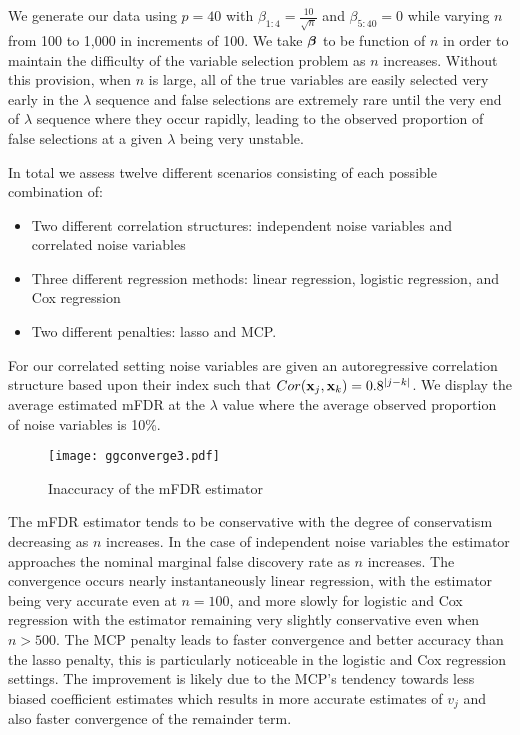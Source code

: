 We generate our data using $p = 40$ with $\beta_{1:4} = \frac{10}{\sqrt{n}}$ and $\beta_{5:40} = 0$ while varying $n$ from 100 to 1,000 in increments of 100. We take $\boldsymbol{\beta}$ to be function of $n$ in order to maintain the difficulty of the variable selection problem as $n$ increases.  Without this provision, when $n$ is large, all of the true variables are easily selected very early in the $\lambda$ sequence and false selections are extremely rare until the very end of $\lambda$ sequence where they occur rapidly, leading to the observed proportion of false selections at a given $\lambda$ being very unstable.

In total we assess twelve different scenarios consisting of each possible combination of:
\begin{itemize}
\item Two different correlation structures: independent noise variables and correlated noise variables
\item Three different regression methods: linear regression, logistic regression, and Cox regression
\item Two different penalties: lasso and MCP. 
\end{itemize}
For our correlated setting noise variables are given an autoregressive correlation structure based upon their index such that $Cor(\mathbf{x}_j,\mathbf{x}_k) = 0.8^{|j - k|}$. We display the average estimated mFDR at the $\lambda$ value where the average observed proportion of noise variables is 10\%.

\begin{figure} [!htb]
 \centering
  \texttt{[image: ggconverge3.pdf]}
  \caption{Inaccuracy of the mFDR estimator}
\end{figure}

The mFDR estimator tends to be conservative with the degree of conservatism decreasing as $n$ increases. In the case of independent noise variables the estimator approaches the nominal marginal false discovery rate as $n$ increases. The convergence occurs nearly instantaneously linear regression, with the estimator being very accurate even at $n=100$, and more slowly for logistic and Cox regression with the estimator remaining very slightly conservative even when $n > 500$. The MCP penalty leads to faster convergence and better accuracy than the lasso penalty, this is particularly noticeable in the logistic and Cox regression settings. The improvement is likely due to the MCP's tendency towards less biased coefficient estimates which results in more accurate estimates of $v_j$ and also faster convergence of the remainder term.

